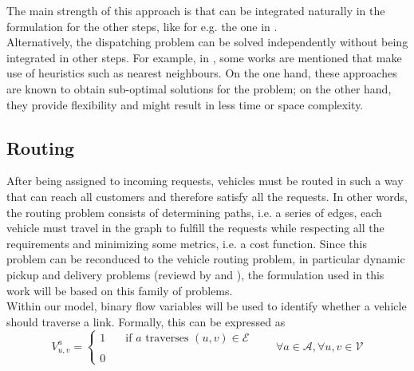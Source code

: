  The main strength of this approach is that can be integrated naturally in the formulation for the other steps, like for e.g. the one in . \\
Alternatively, the dispatching problem can be solved independently without being integrated in other steps. For example, in , some works are mentioned that make use of heuristics such as nearest neighbours. On the one hand, these approaches are known to obtain sub-optimal solutions for the problem; on the other hand, they provide flexibility and might result in less time or space complexity. \\


\subsection{Routing}\label{sec:routing}
After being assigned to incoming requests, vehicles must be routed in such a way that can reach all customers and therefore satisfy all the requests. In other words, the routing problem consists of determining paths, i.e. a series of edges, each vehicle must travel in the graph to fulfill the requests while respecting all the requirements and minimizing some metrics, i.e. a cost function. Since this problem can be reconduced to the
vehicle routing problem, in particular dynamic pickup and delivery problems (reviewd by  and ), the formulation used in this work will be based on this family of problems. \\
Within our model, binary flow variables will be used to identify whether a vehicle should traverse a link. Formally, this can be expressed as 
\begin{equation*}
	V_{u,v}^a = 
	\begin{cases} 
		1 & \quad \text{if $a$ traverses } (u,v) \in \mathcal{E}\\
		\\
		0
	\end{cases}
	\quad\quad \forall a \in \mathcal{A}, \forall u,v \in \mathcal{V}
	\label{eq:binary_edges}
\end{equation*}
